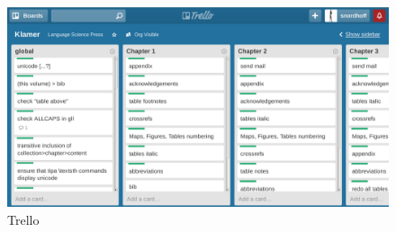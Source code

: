 \begin{figure}
\caption{Trello}
\label{fig:latex:trello}
 \includegraphics[width=\textwidth]{trello.png}
\end{figure}

